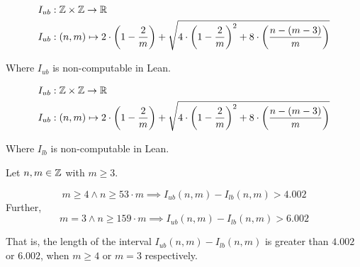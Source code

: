 
\begin{definition}[I ub]
    \label{def:I_ub}
    \leanok
    
    \begin{align*}
        I_{ub} &: \mathbb{Z}\times \mathbb{Z} \to \mathbb{R} \\
        I_{ub} &: (n,m) \mapsto 2 \cdot \left(1 - \frac{2}{m}\right) + \sqrt{4\cdot \left(1 - \frac{2}{m}\right)^2 + 8\cdot \left(\frac{n - (m - 3)}{m}\right)}
    \end{align*}

    Where $I_{ub}$ is non-computable in Lean.
\end{definition}

\begin{definition}[I lb]
    \label{def:I_lb}
    \leanok
    
    \begin{align*}
        I_{ub} &: \mathbb{Z}\times \mathbb{Z} \to \mathbb{R} \\
        I_{ub} &: (n,m) \mapsto 2 \cdot \left(1 - \frac{2}{m}\right) + \sqrt{4\cdot \left(1 - \frac{2}{m}\right)^2 + 8\cdot \left(\frac{n - (m - 3)}{m}\right)}
    \end{align*}

    Where $I_{lb}$ is non-computable in Lean.
\end{definition}

\begin{lemma}[Interval]
    \label{lem:interval}
    \leanok
    Let $n,m\in\mathbb{Z}$ with $m\geq 3$.

    \[
        m \geq 4 \land n \geq 53\cdot m \implies I_{ub}(n,m) - I_{lb}(n,m) > 4.002
    \]
    Further,
    \[
        m = 3\land n \geq 159\cdot m \implies I_{ub}(n,m) - I_{lb}(n,m) > 6.002
    \]

    That is, the length of the interval $I_{ub}(n,m) - I_{lb}(n,m)$ is greater than $4.002$ or $6.002$, when $m\geq 4$ or $m = 3$ respectively.
\end{lemma}

